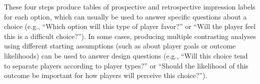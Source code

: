 \documentclass[arts,article,accept,moreauthors,pdftex,10pt,a4paper]{Definitions/mdpi}
\begin{document}
These four steps produce tables of prospective and retrospective impression labels for each option, which can usually be used to answer specific questions about a choice (e.g., ``Which option will this type of player favor?'' or ``Will the player feel this is a difficult choice?'').
%
In some cases, producing multiple contrasting analyses using different starting assumptions (such as about player goals or outcome likelihoods) can be used to answer design questions (e.g., ``Will this choice tend to separate players according to player types?'' or ``Should the likelihood of this outcome be important for how players will perceive this choice?'').

\label{sec:prospective_labels}
\end{document}
